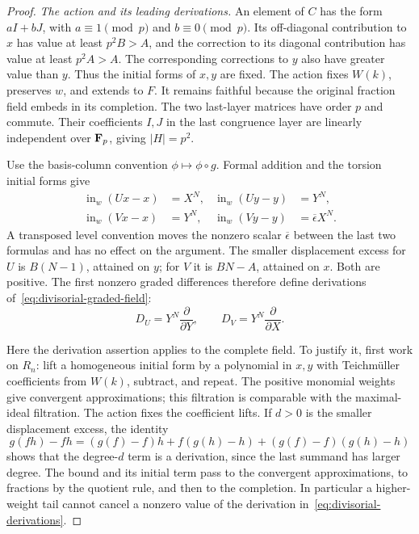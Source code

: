 \begin{proof}
\emph{The action and its leading derivations.}
An element of $C$ has the form $aI+bJ$, with $a\equiv1\pmod p$ and $b\equiv0\pmod p$. Its off-diagonal contribution to $x$ has value at least $p^2B>A$, and the correction to its diagonal contribution has value at least $p^2A>A$. The corresponding corrections to $y$ also have greater value than $y$. Thus the initial forms of $x,y$ are fixed. The action fixes $W(k)$, preserves $w$, and extends to $F$. It remains faithful because the original fraction field embeds in its completion. The two last-layer matrices have order $p$ and commute. Their coefficients $I,J$ in the last congruence layer are linearly independent over $\mathbf F_p$, giving $|H|=p^2$.

Use the basis-column convention $\phi\mapsto\phi\circ g$. Formal addition and the torsion initial forms give
\[
\begin{aligned}
 \operatorname{in}_w(Ux-x)&=X^N,&
 \operatorname{in}_w(Uy-y)&=Y^N,\\
 \operatorname{in}_w(Vx-x)&=Y^N,&
 \operatorname{in}_w(Vy-y)&=\overline\epsilon X^N .
\end{aligned}
\]
A transposed level convention moves the nonzero scalar $\overline\epsilon$ between the last two formulas and has no effect on the argument.
The smaller displacement excess for $U$ is $B(N-1)$, attained on $y$; for $V$ it is $BN-A$, attained on $x$. Both are positive. The first nonzero graded differences therefore define derivations of~\eqref{eq:divisorial-graded-field}:
\begin{equation}\label{eq:divisorial-derivations}
 D_U=Y^N\frac{\partial}{\partial Y},\qquad
 D_V=Y^N\frac{\partial}{\partial X}.
\end{equation}

Here the derivation assertion applies to the complete field. To justify it, first work on $R_n$: lift a homogeneous initial form by a polynomial in $x,y$ with Teichm\"uller coefficients from $W(k)$, subtract, and repeat. The positive monomial weights give convergent approximations; this filtration is comparable with the maximal-ideal filtration. The action fixes the coefficient lifts. If $d>0$ is the smaller displacement excess, the identity
\[
 g(fh)-fh=(g(f)-f)h+f(g(h)-h)+(g(f)-f)(g(h)-h)
\]
shows that the degree-$d$ term is a derivation, since the last summand has larger degree. The bound and its initial term pass to the convergent approximations, to fractions by the quotient rule, and then to the completion. In particular a higher-weight tail cannot cancel a nonzero value of the derivation in~\eqref{eq:divisorial-derivations}.


\end{proof}
